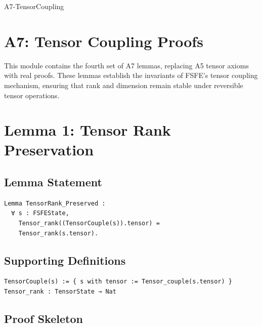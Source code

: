 \documentclass[11pt]{article}
\begin{document}


\begin{citationmembrane}{A7-TensorCoupling}
\end{citationmembrane}

\section*{A7: Tensor Coupling Proofs}

This module contains the fourth set of A7 lemmas, replacing A5 tensor axioms
with real proofs. These lemmas establish the invariants of FSFE’s tensor
coupling mechanism, ensuring that rank and dimension remain stable under
reversible tensor operations.

\newpage


\section{Lemma 1: Tensor Rank Preservation}

\subsection{Lemma Statement}

\begin{verbatim}
Lemma TensorRank_Preserved :
  ∀ s : FSFEState,
    Tensor_rank((TensorCouple(s)).tensor) =
    Tensor_rank(s.tensor).
\end{verbatim}

\subsection{Supporting Definitions}

\begin{verbatim}
TensorCouple(s) := { s with tensor := Tensor_couple(s.tensor) }
Tensor_rank : TensorState → Nat
\end{verbatim}

\subsection{Proof Skeleton}
\end{document}
